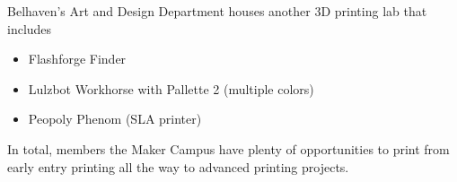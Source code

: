 \noindent Belhaven's Art and Design Department houses another 3D printing lab that includes

\begin{itemize}
    \item Flashforge Finder
    \item Lulzbot Workhorse with Pallette 2 (multiple colors)
    \item Peopoly Phenom (SLA printer)
\end{itemize}

\noindent In total, members the Maker Campus have plenty of opportunities to print from early entry printing all the way to advanced printing projects.
